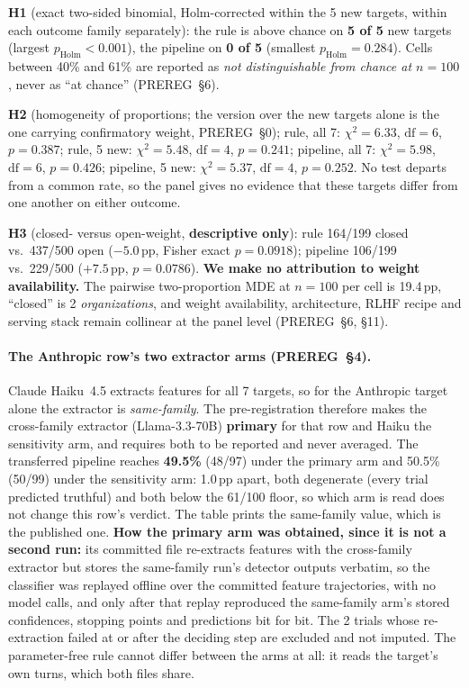 \textbf{H1} (exact two-sided binomial, Holm-corrected within the 5 new targets, within each outcome family separately): the rule is above chance on \textbf{5 of 5} new targets (largest $p_{\mathrm{Holm}}\!<\!0.001$), the pipeline on \textbf{0 of 5} (smallest $p_{\mathrm{Holm}}\!=\!0.284$). Cells between 40\% and 61\% are reported as \emph{not distinguishable from chance at $n\!=\!100$}, never as ``at chance'' (PREREG~§6).

\textbf{H2} (homogeneity of proportions; the version over the new targets alone is the one carrying confirmatory weight, PREREG~§0); rule, all 7: $\chi^2\!=\!6.33$, $\mathrm{df}\!=\!6$, $p\!=\!0.387$; rule, 5 new: $\chi^2\!=\!5.48$, $\mathrm{df}\!=\!4$, $p\!=\!0.241$; pipeline, all 7: $\chi^2\!=\!5.98$, $\mathrm{df}\!=\!6$, $p\!=\!0.426$; pipeline, 5 new: $\chi^2\!=\!5.37$, $\mathrm{df}\!=\!4$, $p\!=\!0.252$. No test departs from a common rate, so the panel gives no evidence that these targets differ from one another on either outcome.

\textbf{H3} (closed- versus open-weight, \textbf{descriptive only}): rule 164/199 closed vs.\ 437/500 open ($-5.0$\,pp, Fisher exact $p\!=\!0.0918$); pipeline 106/199 vs.\ 229/500 ($+7.5$\,pp, $p\!=\!0.0786$). \textbf{We make no attribution to weight availability.} The pairwise two-proportion MDE at $n\!=\!100$ per cell is 19.4\,pp, ``closed'' is 2 \emph{organizations}, and weight availability, architecture, RLHF recipe and serving stack remain collinear at the panel level (PREREG~§6, §11).

\paragraph{The Anthropic row's two extractor arms (PREREG~§4).}
Claude Haiku~4.5 extracts features for all 7 targets, so for the Anthropic target alone the extractor is \emph{same-family}. The pre-registration therefore makes the cross-family extractor (Llama-3.3-70B) \textbf{primary} for that row and Haiku the sensitivity arm, and requires both to be reported and never averaged. The transferred pipeline reaches \textbf{49.5\%} (48/97) under the primary arm and 50.5\% (50/99) under the sensitivity arm: 1.0\,pp apart, both degenerate (every trial predicted truthful) and both below the 61/100 floor, so which arm is read does not change this row's verdict. The table prints the same-family value, which is the published one. \textbf{How the primary arm was obtained, since it is not a second run:} its committed file re-extracts features with the cross-family extractor but stores the same-family run's detector outputs verbatim, so the classifier was replayed offline over the committed feature trajectories, with no model calls, and only after that replay reproduced the same-family arm's stored confidences, stopping points and predictions bit for bit. The 2 trials whose re-extraction failed at or after the deciding step are excluded and not imputed. The parameter-free rule cannot differ between the arms at all: it reads the target's own turns, which both files share.

